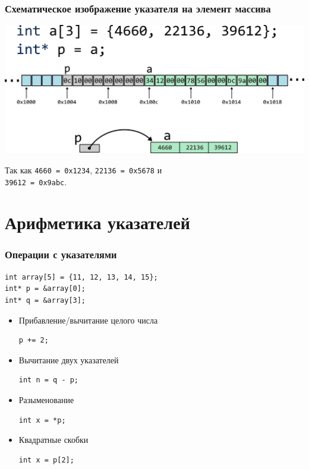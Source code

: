 \documentclass[10pt,pdf,hyperref={unicode}]{beamer}
\begin{document}
\begin{frame}[fragile]
\frametitle{Схематическое изображение указателя на элемент массива} 
\begin{center}
\includegraphics[width=0.86\linewidth]{../images/memory/memory_9_schematic_int_array.png}
\end{center}
Так как \texttt{4660 = 0x1234}, \texttt{22136 = 0x5678} и \\ \texttt{39612 = 0x9abc}.
\end{frame}


\section{Арифметика указателей}

\begin{frame}[fragile]
\frametitle{Операции с указателями}
\begin{lstlisting}
int array[5] = {11, 12, 13, 14, 15};
int* p = &array[0];
int* q = &array[3];
\end{lstlisting}
\begin{itemize}
\item Прибавление/вычитание целого числа
\begin{verbatim}
p += 2;
\end{verbatim}
\item Вычитание двух указателей
\begin{verbatim}
int n = q - p;
\end{verbatim}
\item Разыменование
\begin{verbatim}
int x = *p;
\end{verbatim}
\item Квадратные скобки
\begin{verbatim}
int x = p[2];
\end{verbatim}
\end{itemize}
\end{frame}
\end{document}
